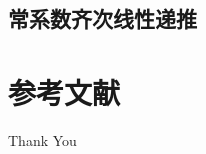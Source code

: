 \documentclass{beamer}
\begin{document}
\subsection{常系数齐次线性递推}

\section{参考文献}

\begin{frame}[allowframebreaks]
    
    
    \nocite{*} %
\end{frame}


\begin{frame}
    \begin{center}
        {\Huge\calligra Thank You}
    \end{center}
\end{frame}
\end{document}
